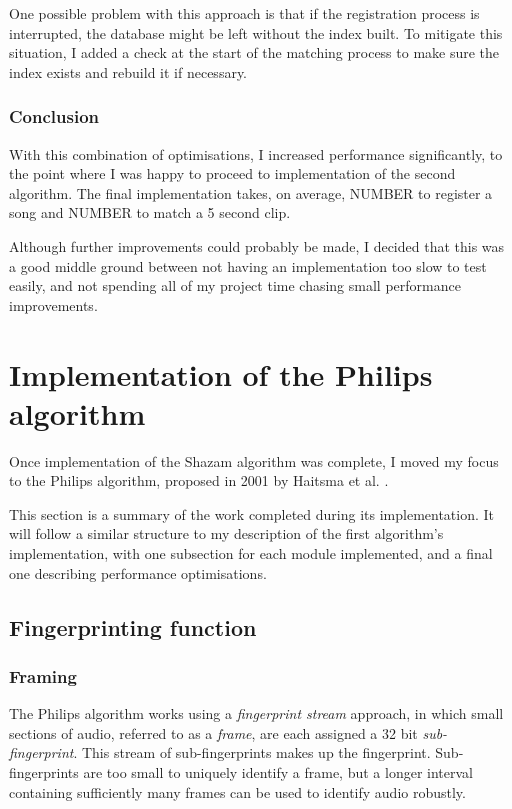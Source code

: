 \documentclass[12pt,a4paper,twoside,openright]{report}
\begin{document}
One possible problem with this approach is that if the registration process is interrupted, the database might be left without the index built. To mitigate this situation, I added a check at the start of the matching process to make sure the index exists and rebuild it if necessary.

\subsubsection{Conclusion}

With this combination of optimisations, I increased performance significantly, to the point where I was happy to proceed to implementation of the second algorithm. The final implementation takes, on average, NUMBER to register a song and NUMBER to match a 5 second clip. %

Although further improvements could probably be made, I decided that this was a good middle ground between not having an implementation too slow to test easily, and not spending all of my project time chasing small performance improvements.



\section{Implementation of the Philips algorithm}
\label{section:philips}

Once implementation of the Shazam algorithm was complete, I moved my focus to the Philips algorithm, proposed in 2001 by Haitsma et al. \cite{Haitsma02}. 

This section is a summary of the work completed during its implementation. It will follow a similar structure to my description of the first algorithm's implementation, with one subsection for each module implemented, and a final one describing performance optimisations.


\subsection{Fingerprinting function}
\label{philips:fingerprinter}

\subsubsection{Framing}

The Philips algorithm works using a \textit{fingerprint stream} approach, in which small sections of audio, referred to as a \textit{frame}, are each assigned a 32 bit \textit{sub-fingerprint}. This stream of sub-fingerprints makes up the fingerprint. Sub-fingerprints are too small to uniquely identify a frame, but a longer interval containing sufficiently many frames can be used to identify audio robustly.
\end{document}
